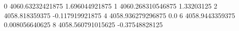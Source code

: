 0 4060.63232421875 1.696044921875
1 4060.268310546875 1.33203125
2 4058.818359375 -0.117919921875
4 4058.936279296875 0.0
6 4058.9443359375 0.008056640625
8 4058.560791015625 -0.37548828125
